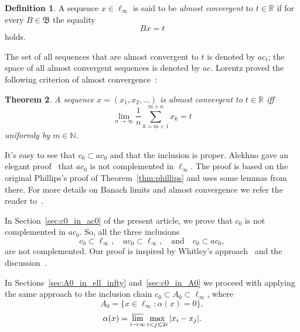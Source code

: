 \documentclass[a4paper,10pt]{article} %
\theoremstyle{plain}
\newtheorem{theorem}{Theorem}[section]
\theoremstyle{definition}
\newtheorem{definition}[theorem]{Definition}
\begin{document}
\begin{definition}
	A sequence $x\in \ell_\infty$ is said to be \emph{almost convergent} to $t\in \mathbb{R}$
	if for every $B\in\mathfrak{B}$ the equality
	\begin{equation}
		Bx = t
	\end{equation}
	holds.
\end{definition}
The set of all sequences that are almost convergent to $t$ is denoted by $ac_t$;
the space of all almost convergent sequences is denoted by $ac$.
Lorentz proved the following criterion of almost convergence~\cite{lorentz1948contribution}:

\begin{theorem}
	A sequence $x=(x_1,x_2,...)$ is almost convergent to $t\in\mathbb{R}$ iff
	\begin{equation}
		\label{eq:crit_Lorentz}
		\lim_{n\to\infty} \frac{1}{n} \sum_{k=m+1}^{m+n} x_k = t
	\end{equation}
	uniformly by $m\in\mathbb{N}$.
\end{theorem}

It's easy to see that $c_0 \subset ac_0$ and that the inclusion is proper.
Alekhno gave an elegant proof~\cite[Theorem 8]{alekhno2006propertiesII}
that $ac_0$ is not complemented in $\ell_\infty$.
The proof is based on the original Phillips's proof of Theorem~\ref{thm:phillips}
and uses some lemmas from there.
For more details on Banach limits and almost convergence we refer the reader to~\cite{sucheston1967banach,Eberlein,semenov2020geomBL}.

In Section~\ref{sec:c0_in_ac0} of the present article, we prove that $c_0$ is not complemented in $ac_0$.
So, all the three inclusions
\begin{equation}
	c_0 \subset \ell_\infty,
	\quad
	ac_0 \subset \ell_\infty,
	\quad\mbox{and}\quad
	c_0 \subset ac_0,
\end{equation}
are not complemented.
Our proof is inspired by Whitley's approach~\cite{whitley1968projecting}
and the discussion~\cite{mathSE_Phillips}.

In Sections~\ref{sec:A0_in_ell_infty} and~\ref{sec:c0_in_A0}
we proceed with applying the same approach to the inclusion chain $c_0 \subset A_0 \subset \ell_\infty$,
where
\begin{equation}
	A_0 = \{x\in\ell_\infty: \alpha(x) = 0\}
	,
\end{equation}
\begin{equation}
	\alpha(x) = \varlimsup_{i\to\infty} \max_{i<j\leqslant 2i} |x_i - x_j|
	.
\end{equation}
\end{document}
